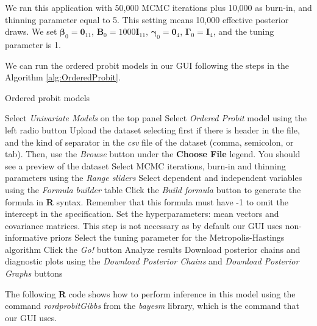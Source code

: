 We ran this application with 50,000 MCMC iterations plus 10,000 as burn-in, and thinning parameter equal to 5. This setting means 10,000 effective posterior draws. We set $\bm{\beta}_0=\bm{0}_{11}$, $\bm{B}_0=1000\bm{I}_{11}$, $\bm{\gamma}_0=\bm{0}_4$, $\bm{\Gamma}_0=\bm{I}_4$, and the tuning parameter is 1.

We can run the ordered probit models in our GUI following the steps in the Algorithm \ref{alg:OrderedProbit}.
 
\begin{algorithm}[h!]
	\caption{Ordered probit models}\label{alg:OrderedProbit}
	\begin{algorithmic}[1]  		 			
		\State Select \textit{Univariate Models} on the top panel
		\State Select \textit{Ordered Probit} model using the left radio button
		\State Upload the dataset selecting first if there is header in the file, and the kind of separator in the \textit{csv} file of the dataset (comma, semicolon, or tab). Then, use the \textit{Browse} button under the \textbf{Choose File} legend. You should see a preview of the dataset
		\State Select MCMC iterations, burn-in and thinning parameters using the \textit{Range sliders}
		\State Select dependent and independent variables using the \textit{Formula builder} table
		\State Click the \textit{Build formula} button to generate the formula in \textbf{R} syntax. Remember that this formula must have -1 to omit the intercept in the specification.
		\State Set the hyperparameters: mean vectors and covariance matrices. This step is not necessary as by default our GUI uses non-informative priors
		\State Select the tuning parameter for the Metropolis-Hastings algorithm 
		\State Click the \textit{Go!} button
		\State Analyze results
		\State Download posterior chains and diagnostic plots using the \textit{Download Posterior Chains} and \textit{Download Posterior Graphs} buttons
	\end{algorithmic} 
\end{algorithm}

The following \textbf{R} code shows how to perform inference in this model using the command \textit{rordprobitGibbs} from the \textit{bayesm} library, which is the command that our GUI uses.

